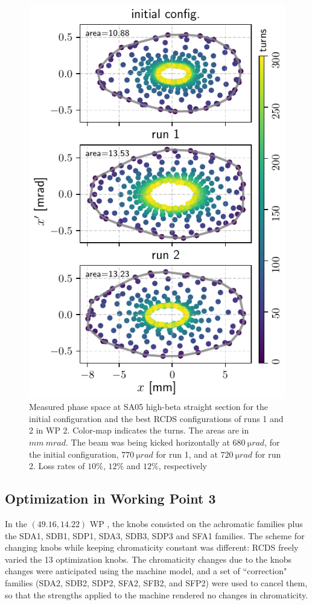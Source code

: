 \documentclass[a4paper,
               keeplastbox,   %
               ]{jacow}
\begin{document}
\begin{figure}
   \includegraphics[width=\columnwidth]{WEPL087_f4.pdf}
   \caption{Measured phase space at SA05 high-beta straight section for the initial configuration and the best RCDS configurations of runs 1 and 2 in WP 2. Color-map indicates the turns. The areas are in $\unit{mm}~\unit{mrad}$. The beam was being kicked horizontally at $680~\unit{\micro rad}$, for the initial configuration, $770~\unit{\micro rad}$ for run 1, and at $720~\unit{\micro rad}$ for run 2. Loss rates of $10\%$, $12\%$ and $12\%$, respectively}
   \label{fig:newtunes_phase}
\end{figure}

\subsection{Optimization in Working Point 3}
In the $(49.16, 14.22)$ WP , the knobs consisted on the achromatic families plus the SDA1, SDB1, SDP1, SDA3, SDB3, SDP3 and SFA1 families. The scheme for changing knobs while keeping chromaticity constant was different: RCDS freely varied the 13 optimization knobs. The chromaticity changes due to the knobs changes were anticipated using the machine model, and a set of ``correction" families (SDA2, SDB2, SDP2, SFA2, SFB2, and SFP2) were used to cancel them, so that the strengths applied to the machine rendered no changes in chromaticity.  
\end{document}
